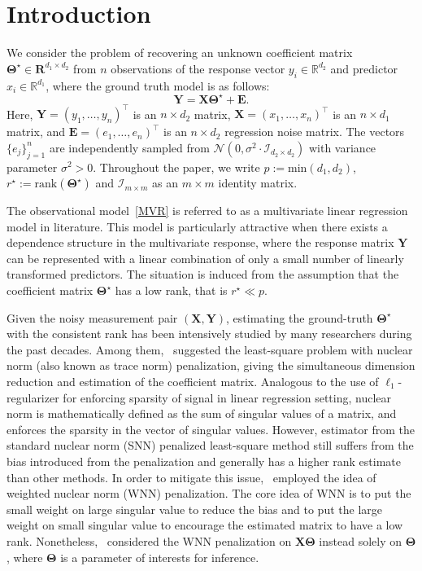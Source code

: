 \documentclass[12pt]{article}
\begin{document}
\section{Introduction}
We consider the problem of recovering an unknown coefficient matrix $\boldsymbol{\Theta^\star}\in \boldsymbol{R}^{d_{1} \times d_{2}}$ from $n$ observations of the response vector $y_{i} \in \mathbb{R}^{d_{2}}$ and predictor $x_{i}\in\mathbb{R}^{d_{1}}$, where the ground truth model is as follows:
\begin{equation}
    \boldsymbol{Y} = \boldsymbol{X}\boldsymbol{\Theta}^{\star} + \boldsymbol{E}. \label{MVR}
\end{equation}
Here, $\boldsymbol{Y}=(y_{1},\dots,y_{n})^{\top}$ is an $n \times d_{2}$ matrix, $\boldsymbol{X}=(x_{1},\dots,x_{n})^{\top}$ is an $n \times d_{1}$ matrix, and $\boldsymbol{E}=(e_{1},\dots,e_{n})^{\top}$ is an $n \times d_{2}$ regression noise matrix.
The vectors $\{e_{j}\}_{j=1}^{n}$ are independently sampled from $\mathcal{N}(0,\sigma^{2} \cdot \mathcal{I}_{d_{2}\times d_{2}})$ with variance parameter $\sigma^{2}>0$.
Throughout the paper, we write $p:=\text{min}(d_{1},d_{2})$, $r^{\star}:=\text{rank}(\boldsymbol{\Theta}^{\star})$ and $\mathcal{I}_{m \times m}$ as an $m \times m$ identity matrix.

The observational model~\eqref{MVR} is referred to as a multivariate linear regression model in literature. 
This model is particularly attractive when there exists a dependence structure in the multivariate response, where the response matrix $\boldsymbol{Y}$ can be represented with a linear combination of only a small number of linearly transformed predictors. 
The situation is induced from the assumption that the coefficient matrix $\boldsymbol{\Theta}^{\star}$ has a low rank, that is $r^{\star} \ll p$.

Given the noisy measurement pair $(\boldsymbol{X},\boldsymbol{Y})$, estimating the ground-truth $\boldsymbol{\Theta}^{\star}$ with the consistent rank has been intensively studied by many researchers during the past decades.
Among them,~\citet{yuan2007dimension} suggested the least-square problem with nuclear norm (also known as trace norm) penalization, giving the simultaneous dimension reduction and estimation of the coefficient matrix.
Analogous to the use of $\ell_{1}$-regularizer for enforcing sparsity of signal in linear regression setting, 
nuclear norm is mathematically defined as the sum of singular values of a matrix, and enforces the sparsity in the vector of singular values.
However, estimator from the standard nuclear norm (SNN) penalized least-square method still suffers from the bias introduced from the penalization and generally has a higher rank estimate than other methods.
In order to mitigate this issue,~\citet{chen2013reduced} employed the idea of weighted nuclear norm (WNN) penalization.
The core idea of WNN is to put the small weight on large singular value to reduce the bias and to put the large weight on small singular value to encourage the estimated matrix to have a low rank. 
Nonetheless,~\citet{chen2013reduced} considered the WNN penalization on $\boldsymbol{X\Theta}$ instead solely on $\boldsymbol{\Theta}$, where $\boldsymbol{\Theta}$ is a parameter of interests for inference.
\end{document}
